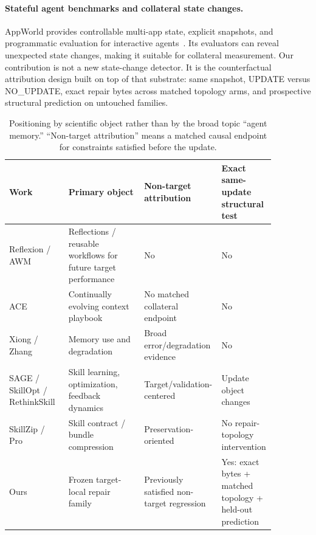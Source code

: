 \documentclass{article}
\begin{document}
\paragraph{Stateful agent benchmarks and collateral state changes.}
AppWorld provides controllable multi-app state, explicit snapshots, and programmatic evaluation for interactive agents~\citep{trivedi2024appworld}. Its evaluators can reveal unexpected state changes, making it suitable for collateral measurement. Our contribution is not a new state-change detector. It is the counterfactual attribution design built on top of that substrate: same snapshot, UPDATE versus NO\_UPDATE, exact repair bytes across matched topology arms, and prospective structural prediction on untouched families.

\begin{table}[t]
\centering
\caption{Positioning by scientific object rather than by the broad topic ``agent memory.'' ``Non-target attribution'' means a matched causal endpoint for constraints satisfied before the update.}
\label{tab:related-position}
\small
\begin{tabular}{p{0.18\linewidth}p{0.28\linewidth}p{0.21\linewidth}p{0.20\linewidth}}
\toprule
Work & Primary object & Non-target attribution & Exact same-update structural test \\
\midrule
Reflexion / AWM~\citep{shinn2023reflexion,wang2025awm} & Reflections / reusable workflows for future target performance & No & No \\
ACE~\citep{zhang2026ace} & Continually evolving context playbook & No matched collateral endpoint & No \\
Xiong / Zhang~\citep{xiong2026memory,zhang2026faultymemory} & Memory use and degradation & Broad error/degradation evidence & No \\
SAGE / SkillOpt / RethinkSkill~\citep{wang2026sage,yang2026skillopt,liu2026rethinking} & Skill learning, optimization, feedback dynamics & Target/validation-centered & Update object changes \\
SkillZip / Pro~\citep{bai2026skillzip,bai2026skillzippro} & Skill contract / bundle compression & Preservation-oriented & No repair-topology intervention \\
Ours & Frozen target-local repair family & Previously satisfied non-target regression & Yes: exact bytes + matched topology + held-out prediction \\
\bottomrule
\end{tabular}
\end{table}
\end{document}
